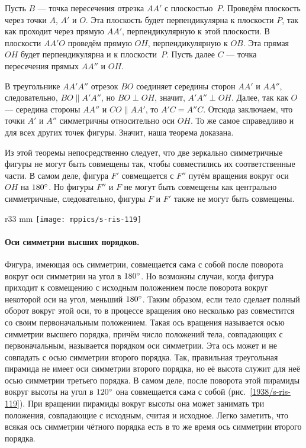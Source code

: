 Пусть $B$ — точка пересечения отрезка $AA'$ с плоскостью~$P$.
Проведём плоскость через точки $A$, $A'$ и $O$.
Эта плоскость будет перпендикулярна к плоскости $P$, так как проходит через прямую $AA'$, перпендикулярную к этой плоскости.
В плоскости $AA'O$ проведём прямую $OH$, перпендикулярную к $OB$.
Эта прямая $OH$ будет перпендикулярна и к плоскости~$P$.
Пусть далее $C$ — точка пересечения прямых $AA''$ и $OH$.

В треугольнике $AA'A''$ отрезок $BO$ соединяет середины сторон $AA'$ и $AA''$, следовательно, $BO\parallel A'A''$, но $BO\perp OH$, значит, $A'A''\perp OH$.
Далее, так как $O$ — середина стороны $AA''$ и $CO\parallel AA'$, то $A'C = A''C$.
Отсюда заключаем, что точки $A'$ и $A''$ симметричны относительно оси $OH$.
То же самое справедливо и для всех других точек фигуры.
Значит, наша теорема доказана.

Из этой теоремы непосредственно следует, что две зеркально симметричные фигуры не могут быть совмещены так, чтобы совместились их соответственные части.
В самом деле, фигура $F'$ совмещается с $F''$ путём вращения вокруг оси $OH$ на $180\degree$.
Но фигуры $F''$ и $F$ не могут быть совмещены как центрально симметричные, следовательно, фигуры $F$ и $F'$ также не могут быть совмещены.

\begin{wrapfigure}{r}{33 mm}
\vskip-8mm
\centering
\texttt{[image: mppics/s-ris-119]}
\caption{}\label{1938/s-ris-119}
\vskip-0mm
\end{wrapfigure}

\paragraph{Оси симметрии высших порядков.}\label{1938/s103}
Фигура, имеющая ось симметрии, совмещается сама с собой после поворота вокруг оси симметрии на угол в $180\degree$.
Но возможны случаи, когда фигура приходит к совмещению с исходным положением после поворота вокруг некоторой оси на угол, меньший $180\degree$.
Таким образом, если тело сделает полный оборот вокруг этой оси, то в процессе вращения оно несколько раз совместится со своим первоначальным положением.
Такая ось вращения называется осью симметрии высшего порядка, причём число положений тела, совпадающих с первоначальным, называется порядком оси симметрии.
Эта ось может и не совпадать с осью симметрии второго порядка.
Так, правильная треугольная пирамида не имеет оси симметрии второго порядка, но её высота служит для неё осью симметрии третьего порядка.
В самом деле, после поворота этой пирамиды вокруг высоты на угол в $120\degree$ она совмещается сама с собой (рис.~\ref{1938/s-ris-119}).
При вращении пирамиды вокруг высоты она может занимать три положения, совпадающие с исходным, считая и исходное.
Легко заметить, что всякая ось симметрии чётного порядка есть в то же время ось симметрии второго порядка.

